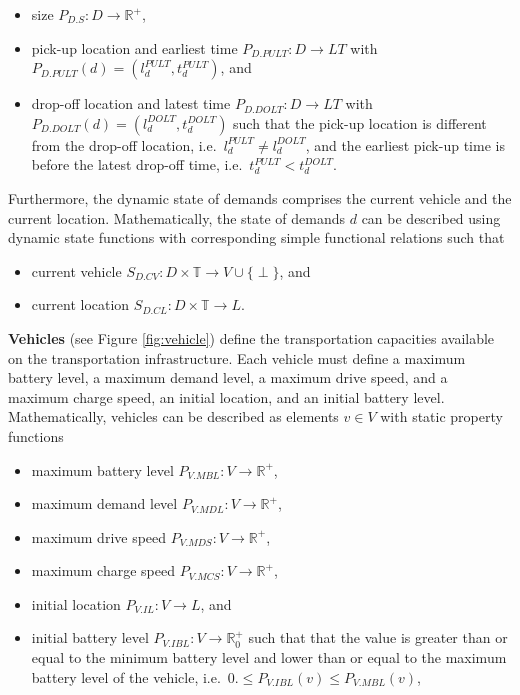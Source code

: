 \documentclass[graybox]{svmult}
\begin{document}
\begin{itemize}
	\item size $P_{D.S}: D \rightarrow \mathbb{R}^+$,
	\item pick-up location and earliest time $P_{D.PULT}: D \rightarrow LT$ with $P_{D.PULT}(d) = (l_d^{PULT},t_d^{PULT})$, and
	\item drop-off location and latest time $P_{D.DOLT}: D \rightarrow LT$ with $P_{D.DOLT}(d) = (l_d^{DOLT},t_d^{DOLT})$ such that the pick-up location is different from the drop-off location, i.e.\ $l_d^{PULT} \neq l_d^{DOLT}$, and the earliest pick-up time is before the latest drop-off time, i.e.\ $t_d^{PULT} < t_d^{DOLT}$.
\end{itemize}
Furthermore, the dynamic state of demands comprises the current vehicle and the current location.
Mathematically, the state of demands $d$ can be described using dynamic state functions with corresponding simple functional relations such that
\begin{itemize}
	\item current vehicle $S_{D.CV}: D \times \mathbb{T} \rightarrow V \cup \{\perp\}$, and
	\item current location $S_{D.CL}: D \times \mathbb{T} \rightarrow L$.
\end{itemize}
\vspace{2mm}
\noindent
\textbf{Vehicles} (see Figure \ref{fig:vehicle})
 define the transportation capacities available on the transportation infrastructure.
Each vehicle must define a maximum battery level, a maximum demand level, a maximum drive speed, and a maximum charge speed, an initial location, and an initial battery level.
Mathematically, vehicles can be described as elements $v \in V$ with static property functions
\begin{itemize}
	\item maximum battery level $P_{V.MBL}: V \rightarrow \mathbb{R}^+$,
	\item maximum demand level $P_{V.MDL}: V \rightarrow \mathbb{R}^+$,
	\item maximum drive speed $P_{V.MDS}: V \rightarrow \mathbb{R}^+$,
	\item maximum charge speed $P_{V.MCS}: V \rightarrow \mathbb{R}^+$,
	\item initial location $P_{V.IL}: V \rightarrow L$, and
	\item initial battery level $P_{V.IBL}: V \rightarrow \mathbb{R}_0^+$ such that that the value is greater than or equal to the minimum battery level and lower than or equal to the maximum battery level of the vehicle, i.e.\ $0. \leq P_{V.IBL}(v) \leq P_{V.MBL}(v)$,
\end{itemize}
\end{document}
